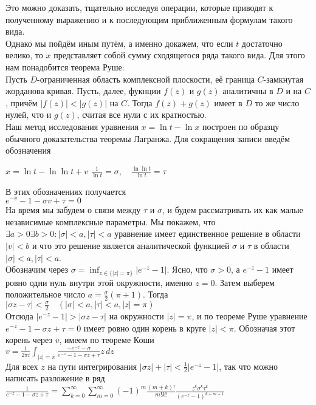 \documentclass{report}
\begin{document}
Это можно доказать, тщательно исследуя операции, которые приводят к полученному выражению и к последующим приближенным формулам такого вида. \\
Однако мы пойдём иным путём, а именно докажем, что если $t$ достаточно велико, то $x$ представляет собой сумму сходящегося ряда такого вида.
Для этого нам понадобится теорема Руше: \\
Пусть $D$-ограниченная область комплексной плоскости, её граница $C$-замкнутая жорданова кривая. Пусть, далее, фукнции $f(z)$ и $g(z)$ аналитичны в $D$ и на $C$,
причём $|f(z)|<|g(z)|$ на $C$. Тогда $f(z)+g(z)$ имеет в $D$ то же число нулей, что и $g(z)$, считая все нули с их кратностью. \\
Наш метод исследования уравнения $x=\ln{t}-\ln{x}$ построен по образцу обычного доказательства теоремы Лагранжа. Для сокращения записи введём обозначения \\
\begin{center}
$x=\ln{t}-\ln\ln{t}+v$
$\frac{1}{\ln{t}}=\sigma,\quad\frac{\ln\ln{t}}{\ln{t}}=\tau$
\end{center}
В этих обозначениях получается \\
$e^{-v}-1-\sigma{v}+\tau=0$ \\
На время мы забудем о связи между $\tau$ и $\sigma$, и будем рассматривать их как малые независимые комплексные параметры. Мы покажем, что $\exists{a>0}\exists{b>0}:|\sigma|<a,|\tau|<a$
уравнение имеет единственное решение в области $|v|<b$ и что это решение является аналитической функцией $\sigma$ и $\tau$ в области $|\sigma|<a, |\tau|<a$. \\
Обозначим через $\sigma=\inf_{z\in\{|z|=\pi\}}|e^{-z}-1|$. Ясно, что $\sigma>0$, а $e^{-z}-1$ имеет ровно одни нуль внутри этой окружности, именно $z=0$.
Затем выберем положительное число $a=\frac{\sigma}{2}(\pi+1)$. Тогда \\
$|\sigma{z}-\tau|<\frac{\sigma}{2}\quad(|\sigma|<a,|\tau|<a,|z|=\pi)$ \\
Отсюда $|e^{-z}-1|>|\sigma{z}-\tau|$ на окружности $|z|=\pi$, и по теореме Руше уравнение $e^{-z}-1-\sigma{z}+\tau=0$ имеет ровно один корень в круге $|z|<\pi$.
Обозначая этот корень через $v$, имеем по теореме Коши \\
$v=\frac{1}{2\pi{i}}\int_{|z|=\pi}\frac{-e^{-z}-\sigma}{e^{-z}-1-\sigma{z}+\tau}z\,dz$ \\
Для всех $z$ на пути интегрирования $|\sigma{z}|+|\tau|<\frac{1}{2}|e^{-z}-1|$, так что можно написать разложение в ряд \\
$\frac{1}{e^{-z}-1-\sigma{z}+\tau}=\sum_{k=0}^{\infty}\sum_{m=0}^{\infty}(-1)^{m}\frac{(m+k)!}{m!k!}\frac{z^{k}\sigma^{k}\tau^{k}}{(e^{-z}-1)^{k+m+1}}$ \\
\end{document}
